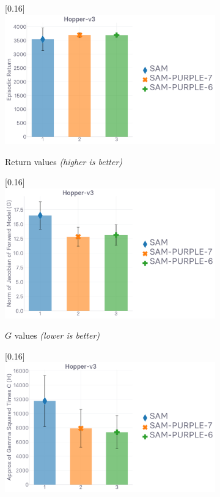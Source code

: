 \begin{figure}
  \center
  \begin{subfigure}[t]{0.33\textwidth}
    \center\scalebox{0.16}[0.16]{\includegraphics{Plots/purple_f_psi_hopper/plots_eval_env_ret_barplot.pdf}}
    \caption{Return values \textit{(higher is better)}}
  \end{subfigure}
  \begin{subfigure}[t]{0.33\textwidth}
    \center\scalebox{0.16}[0.16]{\includegraphics{Plots/purple_f_psi_hopper/plots_mod_2_barplot.pdf}}
    \caption{$G$ values \textit{(lower is better)}}
  \end{subfigure}
  \begin{subfigure}[t]{0.33\textwidth}
    \center\scalebox{0.16}[0.16]{\includegraphics{Plots/purple_f_psi_hopper/plots_gamma2c_barplot.pdf}}

\end{subfigure}
\end{figure}
